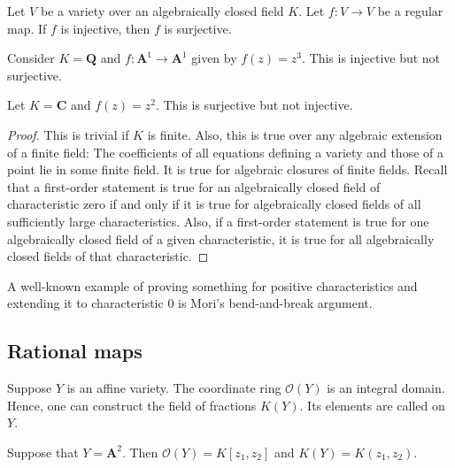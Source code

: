 \documentclass [11 pt, oneside] {article}
\begin{document}
\begin{theorem}[Ax--Grothendieck]\label{}
Let $V$ be a variety over an algebraically closed field $K$. Let $f:V\longrightarrow V$ be a regular map. If $f$ is injective, then $f$ is surjective.
\end{theorem}

\begin{example}\label{}
Consider $K= \mathbf{Q}$ and $f:\mathbf{A}^1\longrightarrow \mathbf{A}^1$ given by $f(z)=z^ 3$. This is injective but not surjective.
\end{example}

\begin{example}\label{}
Let $K=\mathbf{C}$ and $f(z)=z^2$. This is surjective but not injective.
\end{example}

\begin{proof}
This is trivial if $K$ is finite. Also, this is true over any algebraic extension of a finite field: The coefficients of all equations defining a variety and those of a point lie in some finite field. It is true for algebraic closures of finite fields. Recall that a first-order statement is true for an algebraically closed field of characteristic zero if and only if it is true for algebraically closed fields of all sufficiently large characteristics. Also, if a first-order statement is true for one algebraically closed field of a given characteristic, it is true for all algebraically closed fields of that characteristic.
\end{proof}

\begin{remark}
	A well-known example of proving something for positive characteristics and extending it to characteristic $0$ is Mori's bend-and-break argument.
\end{remark}

\subsection{Rational maps}
Suppose $Y$ is an affine variety. The coordinate ring $\mathscr{O}(Y)$ is an integral domain. Hence, one can construct the field of fractions $K(Y)$. Its elements are called  on $Y$.

\begin{example}[ ]\label{}
Suppose that $Y=\mathbf{A}^2$. Then $\mathscr{O}(Y) = K[z_1,z_2]$ and $K(Y) =K(z_1,z_2)$. 
\end{example}
\end{document}

